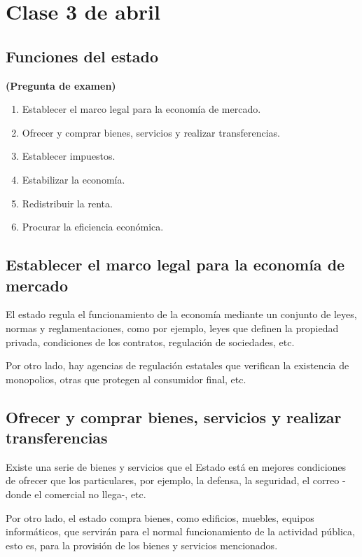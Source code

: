 \section{Clase 3 de abril}

\subsection{Funciones del estado}

\textbf{(Pregunta de examen)}

\begin{enumerate}
    \item Establecer el marco legal para la economía de mercado.
    \item Ofrecer y comprar bienes, servicios y realizar transferencias.
    \item Establecer impuestos.
    \item Estabilizar la economía.
    \item Redistribuir la renta.
    \item Procurar la eficiencia económica.
\end{enumerate}

\subsection{Establecer el marco legal para la economía de mercado}

El estado regula el funcionamiento de la economía mediante un conjunto de leyes,
normas y reglamentaciones, como por ejemplo, leyes que definen la propiedad privada,
condiciones de los contratos, regulación de sociedades, etc.

Por otro lado, hay agencias de regulación estatales que verifican la existencia de monopolios,
otras que protegen al consumidor final, etc.

\subsection{Ofrecer y comprar bienes, servicios y realizar transferencias}

Existe una serie de bienes y servicios que el Estado está en mejores condiciones de ofrecer
que los particulares,
por ejemplo,
la defensa,
la seguridad,
el correo -donde el comercial no llega-,
etc.

Por otro lado,
el estado compra bienes,
como edificios, muebles, equipos informáticos,
que servirán para el normal funcionamiento de la actividad pública,
esto es,
para la provisión de los bienes y servicios mencionados.


